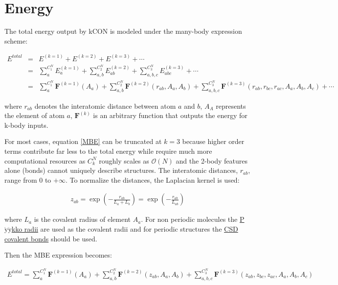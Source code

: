 \section{Energy}

The total energy output by kCON is modeled under the many-body expression scheme:

\begin{eqnarray}\label{MBE}
E^{total}
& = &
E^{(k=1)} + E^{(k=2)} + E^{(k=3)} + \cdots \nonumber \\
& = & 
\sum_{a}^{C^N_1}{E^{(k=1)}_{a}} + 
\sum_{a,b}^{C^{N}_2}{E^{(k=2)}_{ab}} + 
\sum_{a,b,c}^{C^{N}_3}{E^{(k=3)}_{abc}} + \cdots \nonumber \\
& = & 
\sum_{a}^{C^N_1}{\mathbf{F}^{(k=1)}(A_a)} + 
\sum_{a,b}^{C^{N}_2}{\mathbf{F}^{(k=2)}(r_{ab}, A_a, A_b)} + 
\sum_{a,b,c}^{C^{N}_3}{\mathbf{F}^{(k=3)}(r_{ab}, r_{bc}, r_{ac}, A_a, A_b, A_c)} + \cdots
\end{eqnarray}

\noindent where $r_{ab}$ denotes the interatomic distance between atom $a$ and $b$, $A_A$ 
represents the element of atom $a$, $\mathbf{F}^{(k)}$ is an arbitrary function that outputs
the energy for k-body inputs.

For most cases, equation \ref{MBE} can be truncated at $k = 3$ because 
higher order terms contribute far less to the total energy while require much more 
computational resources as $C^N_k$ roughly scales as $\mathcal{O}(N)$ and the 2-body 
features alone (bonds) cannot uniquely describe structures. The interatomic distances, 
${r_{ab}}$, range from 0 to $+\infty$. To normalize the distances, the Laplacian kernel is 
used:

\begin{eqnarray}\label{eqn:laplacian}
z_{ab} 
= \exp{\left(-\frac{r_{ab}}{L_{a} + L_{b}}\right)}
= \exp{\left(-\frac{r_{ab}}{L_{ab}}\right)}
\end{eqnarray}

\noindent where $L_{a}$ is the covalent radius of element $A_{a}$. For non periodic 
molecules the \href{http://pubs.acs.org/doi/pdf/10.1021/jp5065819}
{P$\ddot{\mathrm{y}}\ddot{\mathrm{y}}$kko radii} are used as the covalent radii and 
for periodic structures the 
\href{http://pubs.rsc.org/en/content/articlepdf/2008/DT/B801115J}{CSD covalent bonds} should be 
used. 

Then the MBE expression becomes:

\begin{eqnarray}\label{eqn:total_energy}
E^{total} =
\sum_{a}^{C^N_1}{\mathbf{F}^{(k=1)}(A_a)} + 
\sum_{a,b}^{C^{N}_2}{\mathbf{F}^{(k=2)}(z_{ab}, A_a, A_b)} + 
\sum_{a,b,c}^{C^{N}_3}{\mathbf{F}^{(k=3)}(z_{ab}, z_{bc}, z_{ac}, A_a, A_b, A_c)}
\end{eqnarray}

